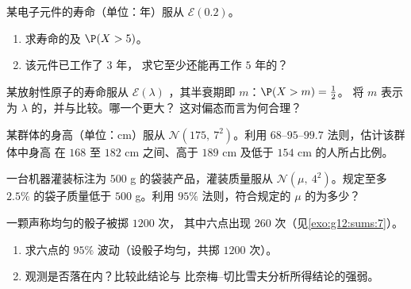 \begin{exercise}[$\star$]\label{exo:g12:contdist:3}
某电子元件的寿命（单位：年）服从
$\mathcal E(0.2)$。
\begin{enumerate}
  \item 求寿命的及 $\P(X > 5)$。
  \item 该元件已工作了 $3$ 年，
        求它至少还能再工作 $5$ 年的？
\end{enumerate}
\end{exercise}

\begin{exercise}[$\star\star$]\label{exo:g12:contdist:4}
某放射性原子的寿命服从
$\mathcal E(\lambda)$ ，其半衰期即 $m$：$\P(X > m) = \frac12$。
将 $m$ 表示为 $\lambda$ 的，并与比较。哪一个更大？
这对偏态而言为何合理？
\end{exercise}

\begin{exercise}[$\star\star$]\label{exo:g12:contdist:5}
某群体的身高（单位：cm）服从 $\mathcal N(175,\ 7^2)$。利用
$68$--$95$--$99.7$ 法则，估计该群体中身高
在 $168$ 至 $182$ cm 之间、高于 $189$ cm 及低于 $154$ cm 的人所占比例。
\end{exercise}

\begin{exercise}[$\star\star$]\label{exo:g12:contdist:6}
一台机器灌装标注为 $500$ g 的袋装产品，灌装质量服从
$\mathcal N(\mu,\ 4^2)$。规定至多 $2.5\%$ 的袋子质量低于
$500$ g。利用 $95\%$ 法则，符合规定的
$\mu$ 的为多少？
\end{exercise}

\begin{exercise}[$\star\star$]\label{exo:g12:contdist:7}
一颗声称均匀的骰子被掷 $1200$ 次，
其中六点出现 $260$ 次（见\cref{exo:g12:sums:7}）。
\begin{enumerate}
  \item 求六点的 $95\%$
        波动（设骰子均匀，共掷 $1200$ 次）。
  \item 观测是否落在内？比较此结论与
        比奈梅–切比雪夫分析所得结论的强弱。
\end{enumerate}
\end{exercise}

